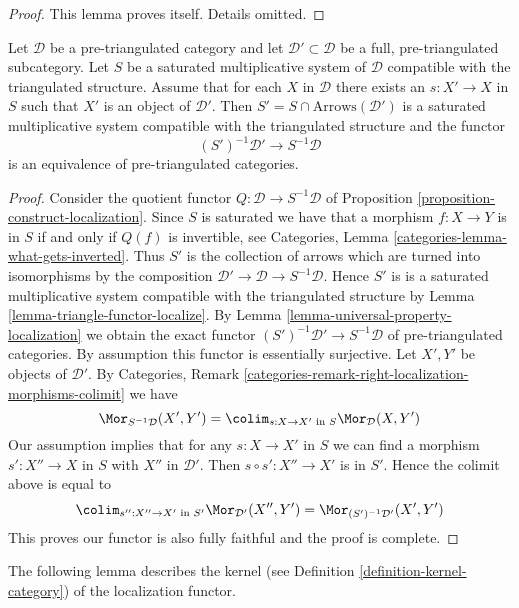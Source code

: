 \begin{proof}
This lemma proves itself. Details omitted.
\end{proof}

\begin{lemma}
\label{lemma-localization-subcategory}
Let $\mathcal{D}$ be a pre-triangulated category and let
$\mathcal{D}' \subset \mathcal{D}$ be a full, pre-triangulated subcategory.
Let $S$ be a saturated multiplicative system of $\mathcal{D}$
compatible with the triangulated structure. Assume that for each $X$
in $\mathcal{D}$ there exists an $s : X' \to X$ in $S$ such that $X'$ is
an object of $\mathcal{D}'$. Then
$S' = S \cap \text{Arrows}(\mathcal{D}')$ is a saturated
multiplicative system compatible with the triangulated structure and
the functor
$$
(S')^{-1}\mathcal{D}' \longrightarrow S^{-1}\mathcal{D}
$$
is an equivalence of pre-triangulated categories.
\end{lemma}

\begin{proof}
Consider the quotient functor $Q : \mathcal{D} \to S^{-1}\mathcal{D}$
of Proposition \ref{proposition-construct-localization}.
Since $S$ is saturated we have that a morphism $f : X \to Y$ is in
$S$ if and only if $Q(f)$ is invertible, see
Categories, Lemma \ref{categories-lemma-what-gets-inverted}.
Thus $S'$ is the collection of arrows which are turned into isomorphisms
by the composition $\mathcal{D}' \to \mathcal{D} \to S^{-1}\mathcal{D}$.
Hence $S'$ is is a saturated multiplicative system compatible with the
triangulated structure by Lemma \ref{lemma-triangle-functor-localize}.
By Lemma \ref{lemma-universal-property-localization} we obtain the
exact functor $(S')^{-1}\mathcal{D}' \to S^{-1}\mathcal{D}$ of pre-triangulated
categories. By assumption this functor is essentially surjective.
Let $X', Y'$ be objects of $\mathcal{D}'$. By Categories, Remark
\ref{categories-remark-right-localization-morphisms-colimit} we have
$$
\Mor_{S^{-1}\mathcal{D}}(X', Y') =
\colim_{s : X \to X'\text{ in }S} \Mor_\mathcal{D}(X, Y')
$$
Our assumption implies that for any $s : X \to X'$ in $S$ we can
find a morphism $s' : X'' \to X$ in $S$ with $X''$ in $\mathcal{D}'$.
Then $s \circ s' : X'' \to X'$ is in $S'$. Hence the colimit above is
equal to
$$
\colim_{s'' : X'' \to X'\text{ in }S'} \Mor_{\mathcal{D}'}(X'', Y') =
\Mor_{(S')^{-1}\mathcal{D}'}(X', Y')
$$
This proves our functor is also fully faithful and the proof is complete.
\end{proof}

\noindent
The following lemma describes the kernel (see
Definition \ref{definition-kernel-category})
of the localization functor.

